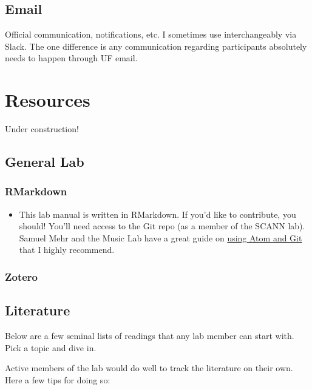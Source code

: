 \documentclass[
  12pt,
]{book}
\providecommand{\tightlist}{%
  \setlength{\itemsep}{0pt}\setlength{\parskip}{0pt}}
\begin{document}
\hypertarget{email}{%
\section{Email}\label{email}}

Official communication, notifications, etc. I sometimes use interchangeably via Slack. The one difference is any communication regarding participants absolutely needs to happen through UF email.

\hypertarget{resources}{%
\chapter{Resources}\label{resources}}

Under construction!

\hypertarget{general-lab}{%
\section{General Lab}\label{general-lab}}

\hypertarget{rmarkdown}{%
\subsection{RMarkdown}\label{rmarkdown}}

\begin{itemize}
\tightlist
\item
  This lab manual is written in RMarkdown. If you'd like to contribute, you should! You'll need access to the Git repo (as a member of the SCANN lab). Samuel Mehr and the Music Lab have a great guide on \href{https://handbook-public.themusiclab.org/themusiclab.org/using-atom-and-git}{using Atom and Git} that I highly recommend.
\end{itemize}

\hypertarget{zotero}{%
\subsection{Zotero}\label{zotero}}

\hypertarget{literature}{%
\section{Literature}\label{literature}}

Below are a few seminal lists of readings that any lab member can start with. Pick a topic and dive in.

Active members of the lab would do well to track the literature on their own. Here a few tips for doing so:
\end{document}

